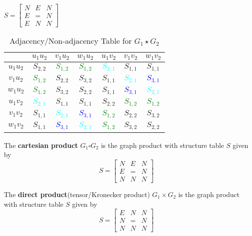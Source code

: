 \begin{commentary}
\begin{table}[hbt]
\centering
$ S = \displaystyle\begin{bmatrix} N & E & N \\ E & = & N \\ E & N & N \end{bmatrix}$
\hfill
\begin{tabular}{|c|c|c|c|c|c|c|} \hline
	& $u_1u_2$ & $v_1u_2$ & $w_1u_2$ & $u_1v_2$ & $v_1v_2$ & $w_1v_2$ \\ \hline
	$u_1u_2$ & $S_{2,2}$ & \textcolor{green}{$S_{1,2}$} & \textcolor{green}{$S_{1,2}$} & \textcolor{cyan}{$S_{2,1}$} & $S_{1,1}$ & $S_{1,1}$ \\ \hline
	$v_1u_2$ & \textcolor{green}{$S_{1,2}$} & $S_{2,2}$ & $S_{3,2}$ & $S_{1,1}$ & \textcolor{cyan}{$S_{2,1}$} & \textcolor{blue}{$S_{3,1}$} \\ \hline
	$w_1u_2$ & \textcolor{green}{$S_{1,2}$} & $S_{3,2}$ & $S_{2,2}$ & $S_{1,1}$ & \textcolor{blue}{$S_{3,1}$} & \textcolor{cyan}{$S_{2,1}$} \\ \hline
	$u_1v_2$ & \textcolor{cyan}{$S_{2,1}$} & $S_{1,1}$ & $S_{1,1}$ & $S_{2,2}$ & \textcolor{green}{$S_{1,2}$} & \textcolor{green}{$S_{1,2}$} \\ \hline
	$v_1v_2$ & $S_{1,1}$ & \textcolor{cyan}{$S_{2,1}$} & \textcolor{blue}{$S_{3,1}$} & \textcolor{green}{$S_{1,2}$} & $S_{2,2}$ & $S_{3,2}$ \\ \hline
	$w_1v_2$ & $S_{1,1}$ & \textcolor{blue}{$S_{3,1}$} & \textcolor{cyan}{$S_{2,1}$} & \textcolor{green}{$S_{1,2}$} & $S_{3,2}$ & $S_{2,2}$ \\ \hline
\end{tabular}
	\caption{Adjacency/Non-adjacency Table for $G_1 \star G_2$}
	\label{tb:generalProduct}
\end{table}
\end{commentary}

\begin{definition}
	The \textbf{cartesian product} $G_1 \square G_2$ is the graph product with structure table $S$ given by
	$$ S = \begin{bmatrix} N & E & N \\ E & = & N \\ N & N & N \end{bmatrix} $$
\end{definition}

\begin{definition}
	The \textbf{direct product}(tensor/Kronecker product) $G_1 \times G_2$ is the graph product with structure table $S$ given by
	$$ S = \begin{bmatrix} E & N & N \\ N & = & N \\ N & N & N \end{bmatrix} $$
\end{definition}

